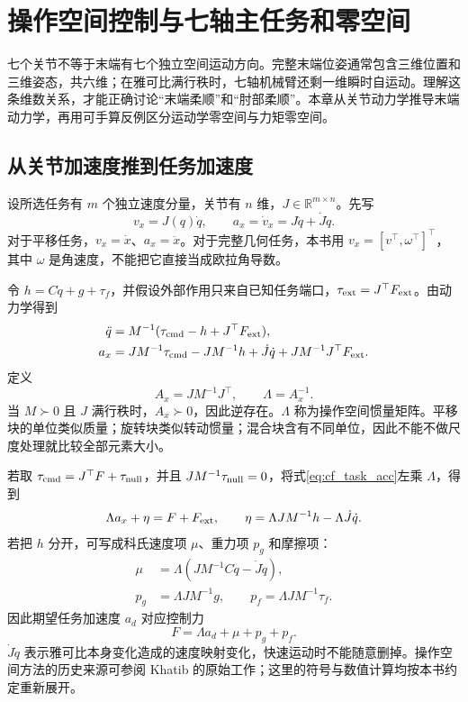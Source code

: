\chapter{操作空间控制与七轴主任务和零空间}
\label{ch:operational_space}

七个关节不等于末端有七个独立空间运动方向。完整末端位姿通常包含三维位置和三维姿态，共六维；在雅可比满行秩时，七轴机械臂还剩一维瞬时自运动。理解这条维数关系，才能正确讨论“末端柔顺”和“肘部柔顺”。本章从关节动力学推导末端动力学，再用可手算反例区分运动学零空间与力矩零空间。

\section{从关节加速度推到任务加速度}

设所选任务有 $m$ 个独立速度分量，关节有 $n$ 维，$J\in\mathbb R^{m\times n}$。先写
\begin{equation}
v_x=J(q)\dot q,
\qquad a_x=\dot v_x=J\ddot q+\dot J\dot q.
\end{equation}
对于平移任务，$v_x=\dot x$、$a_x=\ddot x$。对于完整几何任务，本书用 $v_x=[v^\top,\omega^\top]^\top$，其中 $\omega$ 是角速度，不能把它直接当成欧拉角导数。

令 $h=C\dot q+g+\tau_f$，并假设外部作用只来自已知任务端口，$\tau_{\rm ext}=J^\top F_{\rm ext}$。由动力学得到
\begin{align}
\ddot q&=M^{-1}(\tau_{\rm cmd}-h+J^\top F_{\rm ext}),\\
a_x&=JM^{-1}\tau_{\rm cmd}-JM^{-1}h
+\dot J\dot q+JM^{-1}J^\top F_{\rm ext}.
\label{eq:cf_task_acc}
\end{align}
定义
\begin{equation}
A_x=JM^{-1}J^\top,\qquad
\Lambda=A_x^{-1}.
\label{eq:cf_lambda}
\end{equation}
当 $M\succ0$ 且 $J$ 满行秩时，$A_x\succ0$，因此逆存在。$\Lambda$ 称为操作空间惯量矩阵。平移块的单位类似质量；旋转块类似转动惯量；混合块含有不同单位，因此不能不做尺度处理就比较全部元素大小。

若取 $\tau_{\rm cmd}=J^\top F+\tau_{\rm null}$，并且 $JM^{-1}\tau_{\rm null}=0$，将式\eqref{eq:cf_task_acc}左乘 $\Lambda$，得到
\begin{equation}
\Lambda a_x+\eta=F+F_{\rm ext},
\qquad \eta=\Lambda JM^{-1}h-\Lambda\dot J\dot q.
\end{equation}
若把 $h$ 分开，可写成科氏速度项 $\mu$、重力项 $p_g$ 和摩擦项：
\begin{align}
\mu&=\Lambda(JM^{-1}C\dot q-\dot J\dot q),\\
p_g&=\Lambda JM^{-1}g,\qquad
p_f=\Lambda JM^{-1}\tau_f.
\end{align}
因此期望任务加速度 $a_d$ 对应控制力
\[
F=\Lambda a_d+\mu+p_g+p_f.
\]
$\dot J\dot q$ 表示雅可比本身变化造成的速度映射变化，快速运动时不能随意删掉。操作空间方法的历史来源可参阅 Khatib 的原始工作\cite{khatib}；这里的符号与数值计算均按本书约定重新展开。

